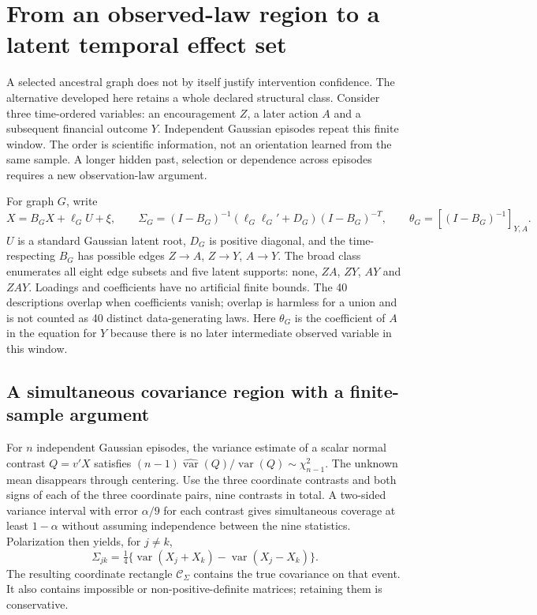 \section{From an observed-law region to a latent temporal effect set}
\label{c7:latent-confidence}
A selected ancestral graph does not by itself justify intervention confidence.
The alternative developed here retains a whole declared structural class.
Consider three time-ordered variables: an encouragement $Z$, a later action
$A$ and a subsequent financial outcome $Y$. Independent Gaussian episodes
repeat this finite window. The order is scientific information, not an
orientation learned from the same sample. A longer hidden past, selection or
dependence across episodes requires a new observation-law argument.

For graph $G$, write
\begin{equation}
 X=B_GX+\ell_G U+\xi,\qquad
 \Sigma_G=(I-B_G)^{-1}(\ell_G\ell_G'+D_G)(I-B_G)^{-T},\qquad
 \theta_G=[(I-B_G)^{-1}]_{Y,A}.
 \label{c7:structural-map}
\end{equation}
$U$ is a standard Gaussian latent root, $D_G$ is positive diagonal, and
the time-respecting $B_G$ has possible edges $Z\to A$, $Z\to Y$, $A\to Y$.
The broad class enumerates all eight edge subsets and five latent supports:
none, $ZA$, $ZY$, $AY$ and $ZAY$. Loadings and coefficients have no artificial
finite bounds. The 40 descriptions overlap when coefficients vanish; overlap
is harmless for a union and is not counted as 40 distinct data-generating laws.
Here $\theta_G$ is the coefficient of $A$ in the equation for $Y$ because
there is no later intermediate observed variable in this window.

\subsection{A simultaneous covariance region with a finite-sample argument}
For $n$ independent Gaussian episodes, the variance estimate of a scalar
normal contrast $Q=v'X$ satisfies
$(n-1)\widehat{\operatorname{var}}(Q)/\operatorname{var}(Q)
\sim\chi^2_{n-1}$. The unknown mean disappears through centering.
Use the three coordinate contrasts and both signs of each of the three
coordinate pairs, nine contrasts in total. A two-sided variance interval
with error $\alpha/9$ for each contrast gives simultaneous coverage at least
$1-\alpha$ without assuming independence between the nine statistics.
Polarization then yields, for $j\ne k$,
\[
 \Sigma_{jk}=\tfrac14\{\operatorname{var}(X_j+X_k)
                          -\operatorname{var}(X_j-X_k)\}.
\]
The resulting coordinate rectangle $\mathcal C_\Sigma$ contains the true
covariance on that event. It also contains impossible or non-positive-definite
matrices; retaining them is conservative.

